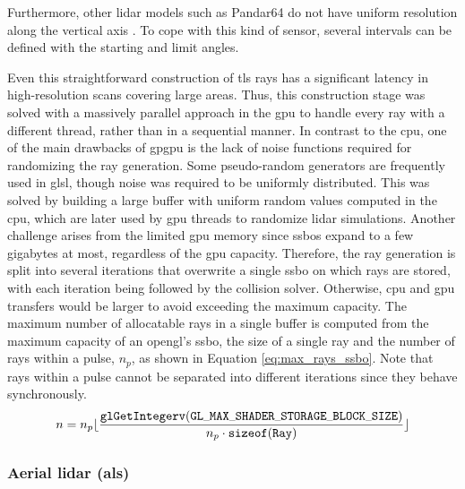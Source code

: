 Furthermore, other \acrshort{lidar} models such as Pandar64 do not have uniform resolution along the vertical axis \cite{hesai_pandaset_2021}. To cope with this kind of sensor, several intervals can be defined with the starting and limit angles.  

Even this straightforward construction of \acrshort{tls} rays has a significant latency in high-resolution scans covering large areas. Thus, this construction stage was solved with a massively parallel approach in the \acrshort{gpu} to handle every ray with a different thread, rather than in a sequential manner. In contrast to the \acrshort{cpu}, one of the main drawbacks of \acrshort{gpgpu} is the lack of noise functions required for randomizing the ray generation. Some pseudo-random generators are frequently used in \acrshort{glsl}, though noise was required to be uniformly distributed. This was solved by building a large buffer with uniform random values computed in the \acrshort{cpu}, which are later used by \acrshort{gpu} threads to randomize \acrshort{lidar} simulations. Another challenge arises from the limited \acrshort{gpu} memory since \acrshort{ssbo}s expand to a few gigabytes at most, regardless of the \acrshort{gpu} capacity. Therefore, the ray generation is split into several iterations that overwrite a single \acrshort{ssbo} on which rays are stored, with each iteration being followed by the collision solver. Otherwise, \acrshort{cpu} and \acrshort{gpu} transfers would be larger to avoid exceeding the maximum capacity. The maximum number of allocatable rays in a single buffer is computed from the maximum capacity of an \acrshort{opengl}'s \acrshort{ssbo}, the size of a single ray and the number of rays within a pulse, $n_p$, as shown in Equation \ref{eq:max_rays_ssbo}. Note that rays within a pulse cannot be separated into different iterations since they behave synchronously.
\begin{equation}
    \label{eq:max_rays_ssbo}   
    n = n_p\lfloor{\frac{\mathtt{\tiny{glGetIntegerv(GL\_MAX\_SHADER\_STORAGE\_BLOCK\_SIZE)}}}{n_p \cdot \tiny{\mathtt{sizeof(Ray)}}}\rfloor}
\end{equation}

\subsubsection{Aerial \acrshort{lidar} (\acrshort{als})}

